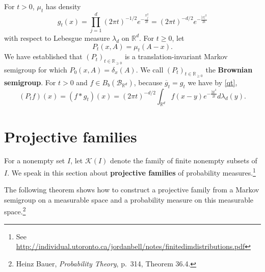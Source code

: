 \documentclass{article}
\theoremstyle{definition}
\begin{document}
For $t>0$, $\mu_t$ has density
\[
g_t(x) = \prod_{j=1}^d (2\pi t)^{-1/2} e^{-\frac{x_j^2}{2t}}
=(2\pi t)^{-d/2} e^{-\frac{|x|^2}{2t}}
\]
with respect to Lebesgue measure $\lambda_d$ on $\mathbb{R}^d$. 
For $t \geq 0$,
let
\[
P_t(x,A) = \mu_t(A-x).
\]
We have established that $(P_t)_{t \in \mathbb{R}_{\geq 0}}$ is a translation-invariant Markov semigroup
for which $P_0(x,A)=\delta_x(A)$. We call $(P_t)_{t \in \mathbb{R}_{\geq 0}}$ the \textbf{Brownian semigroup}.
For $t>0$ and $f \in B_b(\mathscr{B}_{\mathbb{R}^d})$,
because $\overline{g}_t=g_t$ we have by \eqref{qt},
\[
(P_t f)(x) = (f*g_t)(x) = 
(2\pi t)^{-d/2} \int_{\mathbb{R}^d} f(x-y) e^{-\frac{|y|^2}{2t}} d\lambda_d(y).
\]


\section{Projective families}
For a nonempty set $I$, let $\mathscr{K}(I)$ denote the family of finite nonempty subsets of $I$. 
We speak in this section about \textbf{projective families} of probability measures.\footnote{See \url{http://individual.utoronto.ca/jordanbell/notes/finitedimdistributions.pdf}}


The following theorem shows how to construct a projective family from   a Markov semigroup on a measurable space and a probability measure
on this measurable space.\footnote{Heinz Bauer, {\em Probability Theory},
p.~314, Theorem 36.4.}
\end{document}
